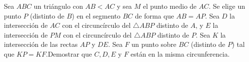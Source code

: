 Sea $ABC$ un triángulo con $AB\lt AC$ y sea $M$ el punto medio de $AC$. Se elige un punto $P$ (distinto de $B$) en el segmento $BC$ de forma que $AB=AP$. Sea $D$ la intersección de $AC$ con el circuncírculo del $\bigtriangleup ABP$ distinto de $A$, y $E$ la intersección de $PM$ con el circuncírculo del $\triangle ABP$ distinto de $P$. Sea $K$ la intersección de las rectas $AP$ y $DE$. Sea $F$ un punto sobre $BC$ (distinto de $P$) tal que $KP=KF$.Demostrar que $C, D, E$ y $F$ están en la misma circunferencia.
